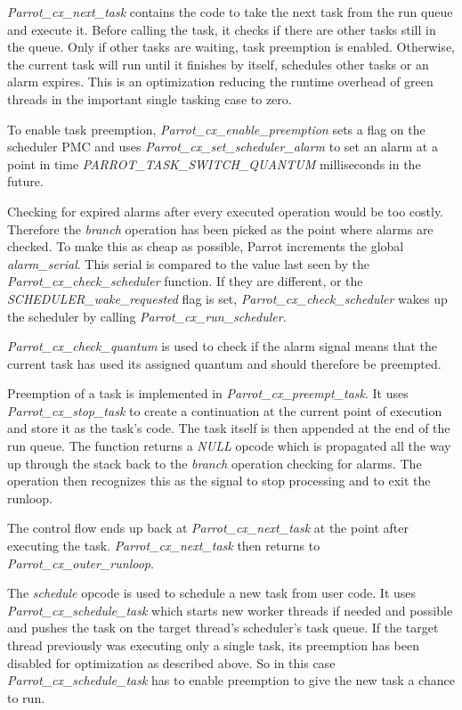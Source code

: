 \documentclass[bachelor,english]{hgbthesis}
\begin{document}
\textit{Parrot\_cx\_next\_task} contains the code to take the next task from the run queue and execute it. Before calling the task, it checks if there are other tasks still in the queue. Only if other tasks are waiting, task preemption is enabled. Otherwise, the current task will run until it finishes by itself, schedules other tasks or an alarm expires. This is an optimization reducing the runtime overhead of green threads in the important single tasking case to zero.

To enable task preemption, \textit{Parrot\_cx\_enable\_preemption} sets a flag on the scheduler PMC and uses \textit{Parrot\_cx\_set\_scheduler\_alarm} to set an alarm at a point in time \textit{PARROT\_TASK\_SWITCH\_QUANTUM} milliseconds in the future.

Checking for expired alarms after every executed operation would be too costly. Therefore the \textit{branch} operation has been picked as the point where alarms are checked. To make this as cheap as possible, Parrot increments the global \textit{alarm\_serial}. This serial is compared to the value last seen by the \textit{Parrot\_cx\_check\_scheduler} function. If they are different, or the \textit{SCHEDULER\_wake\_requested} flag is set, \textit{Parrot\_cx\_check\_scheduler} wakes up the scheduler by calling \textit{Parrot\_cx\_run\_scheduler}.

\textit{Parrot\_cx\_check\_quantum} is used to check if the alarm signal means that the current task has used its assigned quantum and should therefore be preempted.

Preemption of a task is implemented in \textit{Parrot\_cx\_preempt\_task}. It uses \textit{Parrot\_cx\_stop\_task} to create a continuation at the current point of execution and store it as the task's code. The task itself is then appended at the end of the run queue. The function returns a \textit{NULL} opcode which is propagated all the way up through the stack back to the \textit{branch} operation checking for alarms. The operation then recognizes this as the signal to stop processing and to exit the runloop.

The control flow ends up back at \textit{Parrot\_cx\_next\_task} at the point after executing the task. \textit{Parrot\_cx\_next\_task} then returns to \textit{Parrot\_cx\_\-outer\_\-runloop}.

The \textit{schedule} opcode is used to schedule a new task from user code. It uses \textit{Parrot\_cx\_schedule\_task} which starts new worker threads if needed and possible and pushes the task on the target thread's scheduler's task queue. If the target thread previously was executing only a single task, its preemption has been disabled for optimization as described above. So in this case \textit{Parrot\_cx\_schedule\_task} has to enable preemption to give the new task a chance to run.
\end{document}
